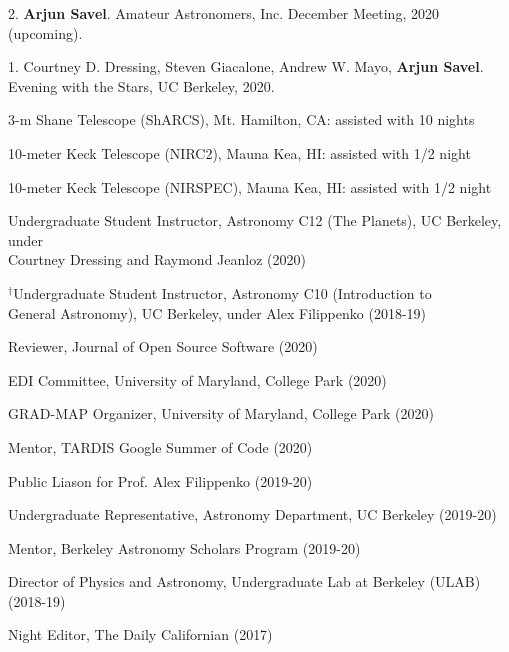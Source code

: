 \documentclass[12pt,letterpaper]{article}
\begin{document}
\begin{list}{}{\cvlist}
\item 2. \textbf{Arjun Savel}. Amateur Astronomers, Inc. December Meeting, 2020 (upcoming).
\item 1. Courtney D. Dressing, Steven Giacalone, Andrew W. Mayo, \textbf{Arjun Savel}. Evening with the Stars, UC Berkeley, 2020.
\end{list}



\begin{list}{}{\cvlist}

\item 3-m Shane Telescope (ShARCS), Mt. Hamilton, CA: assisted with 10 nights
\item 10-meter Keck Telescope (NIRC2), Mauna Kea, HI: assisted with 1/2 night
\item 10-meter Keck Telescope (NIRSPEC), Mauna Kea, HI: assisted with 1/2 night

\end{list}


\begin{list}{}{\cvlist}
\item Undergraduate Student Instructor, Astronomy C12 (The Planets), UC Berkeley, under \\ Courtney Dressing and Raymond Jeanloz (2020)
\item $^\dagger$Undergraduate Student Instructor, Astronomy C10 (Introduction to \\ General Astronomy), UC Berkeley, under Alex Filippenko (2018-19)
\end{list}

\begin{list}{}{\cvlist}
\item Reviewer, Journal of Open Source Software (2020)
\item EDI Committee, University of Maryland, College Park (2020)
\item GRAD-MAP Organizer, University of Maryland, College Park (2020)
\item Mentor, TARDIS Google Summer of Code (2020)
\item Public Liason for Prof. Alex Filippenko (2019-20)
\item Undergraduate Representative, Astronomy Department, UC Berkeley (2019-20)
\item Mentor, Berkeley Astronomy Scholars Program (2019-20)
\item Director of Physics and Astronomy, Undergraduate Lab at Berkeley (ULAB) (2018-19)
\item Night Editor, The Daily Californian (2017)
\end{list}
\end{document}
